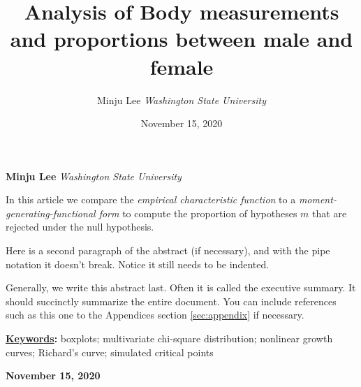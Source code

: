 \documentclass[]{article}
\title{\textbf{\textcolor{WSU.crimson}{Analysis of Body measurements and
proportions between male and female}}  }
\author{\Large Minju
Lee\vspace{0.05in} \newline\normalsize\emph{Washington State
University}  }
\date{November 15, 2020}
\newcommand*{\authorfont}{\fontfamily{phv}\selectfont}
\renewenvironment{abstract}
 {{%
    \setlength{\leftmargin}{0mm}
    \setlength{\rightmargin}{\leftmargin}%
  }%
  \relax}
 {\endlist}
\begin{document}
	
%    


{%
\setlength{\parindent}{0pt}
\thispagestyle{plain}
{\fontsize{18}{20}\selectfont\raggedright 
\maketitle  %

}

{
   \vskip 13.5pt\relax \normalsize\fontsize{11}{12} 
   
\textbf{\authorfont Minju Lee} \hskip 15pt \emph{\small Washington State
University}   

}

}








\begin{abstract}

    \hbox{\vrule height .2pt width 39.14pc}

    \vskip 8.5pt %

\noindent In this article we compare the
\emph{empirical characteristic function} \citep{Tukey:1977, Becker:1988}
to a \emph{moment-generating-functional form} to compute the proportion
of hypotheses \(m\) that are rejected under the null hypothesis.
\vspace{0.25in}

\noindent Here is a second paragraph of the abstract (if necessary), and
with the pipe notation it doesn't break. Notice it still needs to be
indented. \vspace{0.25in}

\noindent Generally, we write this abstract last. Often it is called the
executive summary. It should succinctly summarize the entire document.
You can include references such as this one to the Appendices section
\ref{sec:appendix} if necessary.


\vskip 8.5pt \noindent \textbf{\underline{Keywords}:} boxplots;
multivariate chi-square distribution; nonlinear growth curves; Richard's
curve; simulated critical points \par

    




    
    \hbox{\vrule height .2pt width 39.14pc}
    \vskip 5pt 
    \hfill \textbf{\textcolor{WSU.gray}{ November 15, 2020 } }
    \vskip 5pt 
    
\end{abstract}
\end{document}
